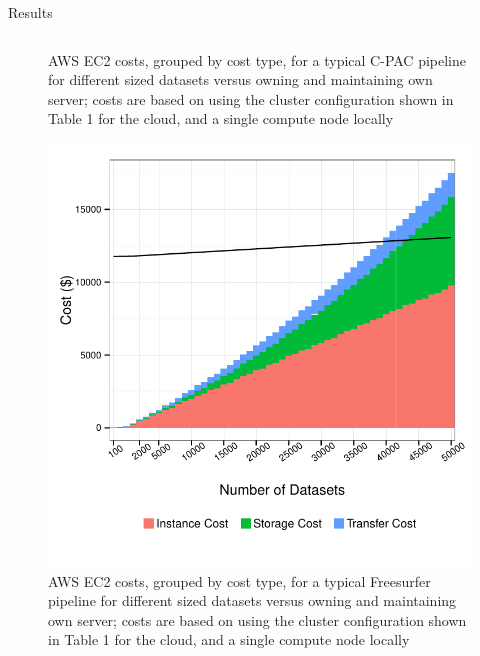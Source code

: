 \documentclass[final,hyperref={pdfpagelabels=false}]{beamer}
\begin{document}
\begin{frame}
\begin{columns}
\begin{column}{.5\textwidth}
\begin{block}{Results}
\begin{column}{.47\textwidth}
\begin{figure}
                    \caption{\label{fig:cpac-costs}AWS EC2 costs, grouped by cost type, for a typical C-PAC pipeline for different sized datasets versus owning and maintaining own server; costs are based on using the cluster configuration shown in Table 1 for the cloud, and a single compute node locally}
                \end{figure}
                \begin{figure}
                    \includegraphics[width=.99\textwidth]{fs-costs.pdf}
                    \caption{\label{fig:fs-costs}AWS EC2 costs, grouped by cost type, for a typical Freesurfer pipeline for different sized datasets versus owning and maintaining own server; costs are based on using the cluster configuration shown in Table 1 for the cloud, and a single compute node locally}
                \end{figure}
            \end{column}
            \begin{column}{.47\textwidth}
                \begin{figure}

\end{figure}
\end{column}
\end{block}
\end{column}
\end{columns}
\end{frame}
\end{document}
